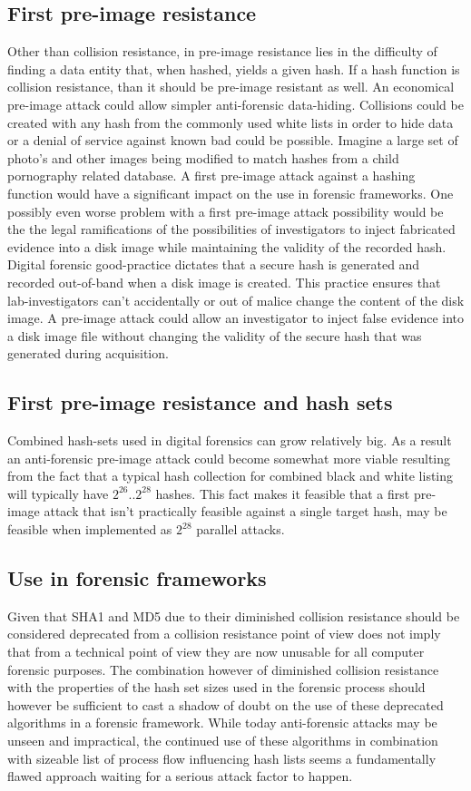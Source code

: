 \subsection{First pre-image resistance}
Other than collision resistance, in pre-image resistance lies in the difficulty of finding a data entity that, when hashed, yields a given hash. If a hash function is collision resistance, than it should be pre-image resistant as well. An economical pre-image attack could allow simpler anti-forensic data-hiding. Collisions could be created with any hash from the commonly used white lists in order to hide data or a denial of service against known bad could be possible. Imagine a large set of photo's and other images being modified to match hashes from a child pornography related database. A first pre-image attack against a hashing function would have a significant impact on the use in forensic frameworks. One possibly even worse problem with a first pre-image attack possibility would be the the legal ramifications of the possibilities of investigators to inject fabricated evidence into a disk image while maintaining the validity of the recorded hash. Digital forensic good-practice dictates that a secure hash is generated and recorded out-of-band when a disk image is created. This practice ensures that lab-investigators can't accidentally or out of malice change the content of the disk image. A pre-image attack could allow an investigator to inject false evidence into a disk image file without changing the validity of the secure hash that was generated during acquisition. 
\subsection{First pre-image resistance and hash sets}
Combined hash-sets used in digital forensics can grow relatively big. As a result an anti-forensic pre-image attack could become somewhat more viable resulting from the fact that a typical hash collection for combined black and white listing will typically have \(2^{26} .. 2^{28} \) hashes. This fact makes it feasible that a first pre-image attack that isn't practically feasible against a single target hash, may be feasible when implemented as \(2^{28}\) parallel attacks. 
\subsection{Use in forensic frameworks}
Given that SHA1 and MD5 due to their diminished collision resistance should be considered deprecated from a collision resistance point of view does not imply that from a technical point of view they are now unusable for all computer forensic purposes. The combination however of diminished collision resistance with the properties of the hash set sizes used in the forensic process should however be sufficient to cast a shadow of doubt on the use of these deprecated algorithms in a forensic framework. While today anti-forensic attacks may be unseen and impractical, the continued use of these algorithms in combination with sizeable list of process flow influencing hash lists seems a fundamentally flawed approach waiting for a serious attack factor to happen.
